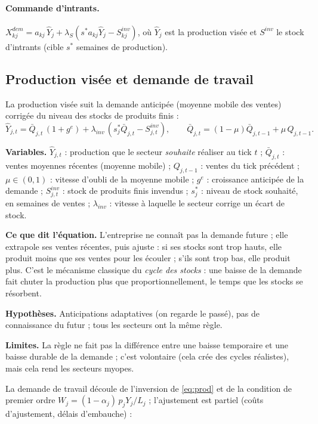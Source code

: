 \documentclass[11pt,a4paper]{article}
\newcommand{\variables}{\par\noindent\textbf{Variables.} }
\newcommand{\sens}{\par\noindent\textbf{Ce que dit l'équation.} }
\newcommand{\hyp}{\par\noindent\textbf{Hypothèses.} }
\newcommand{\limites}{\par\noindent\textbf{Limites.} }
\begin{document}
\paragraph{Commande d'intrants.} $X^{dem}_{kj} = a_{kj}\, \hat Y_j + \lambda_S (s^\ast a_{kj}\hat Y_j - S^{inv}_{kj})$, où $\hat Y_j$ est la production visée et $S^{inv}$ le stock d'intrants (cible $s^\ast$ semaines de production).

\subsection{Production visée et demande de travail}
\label{sec:stocks}
La production visée suit la demande anticipée (moyenne mobile des ventes) corrigée du niveau des stocks de produits finis :
\begin{equation}
\hat Y_{j,t} = \bar Q_{j,t}\,(1 + g^e) + \lambda_{inv}\,(s^\ast_j \bar Q_{j,t} - S^{inv}_{j,t}),
\qquad \bar Q_{j,t} = (1-\mu)\bar Q_{j,t-1} + \mu\, Q_{j,t-1}.
\end{equation}
\begin{lecture}
\variables $\hat Y_{j,t}$ : production que le secteur \emph{souhaite} réaliser au tick $t$ ; $\bar Q_{j,t}$ : ventes moyennes récentes (moyenne mobile) ; $Q_{j,t-1}$ : ventes du tick précédent ; $\mu\in(0,1)$ : vitesse d'oubli de la moyenne mobile ; $g^e$ : croissance anticipée de la demande ; $S^{inv}_{j,t}$ : stock de produits finis invendus ; $s^\ast_j$ : niveau de stock souhaité, en semaines de ventes ; $\lambda_{inv}$ : vitesse à laquelle le secteur corrige un écart de stock.
\sens L'entreprise ne connaît pas la demande future ; elle extrapole ses ventes récentes, puis ajuste : si ses stocks sont trop hauts, elle produit moins que ses ventes pour les écouler ; s'ils sont trop bas, elle produit plus. C'est le mécanisme classique du \emph{cycle des stocks} : une baisse de la demande fait chuter la production plus que proportionnellement, le temps que les stocks se résorbent.
\hyp Anticipations adaptatives (on regarde le passé), pas de connaissance du futur ; tous les secteurs ont la même règle.
\limites La règle ne fait pas la différence entre une baisse temporaire et une baisse durable de la demande ; c'est volontaire (cela crée des cycles réalistes), mais cela rend les secteurs myopes.
\end{lecture}
La demande de travail découle de l'inversion de \eqref{eq:prod} et de la condition de premier ordre $W_j = (1-\alpha_j)\, p_j Y_j / L_j$ ; l'ajustement est partiel (coûts d'ajustement, délais d'embauche) :
\end{document}
